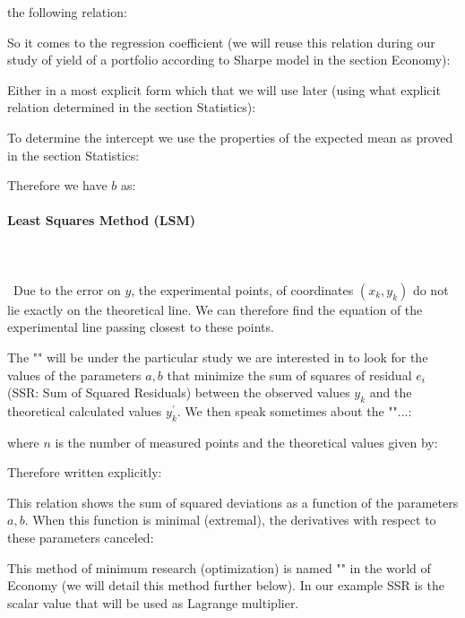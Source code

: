 	the following relation:
	
	So it comes to the regression coefficient (we will reuse this relation during our study of yield of a portfolio according to Sharpe model in the section Economy):
	
	Either in a most explicit form which that we will use later (using what explicit relation determined in the section Statistics):
	
	To determine the intercept we use the properties of the expected mean as proved in the section Statistics:
	
	Therefore we have $b$ as:
	
	
	\paragraph{Least Squares Method (LSM)}\mbox{}\\\\\
	Due to the error on $y$, the experimental points, of coordinates $(x_k,y_k)$ do not lie exactly on the theoretical line. We can therefore find the equation of the experimental  line passing closest to these points.
	
	The "" will be under the particular study we are interested in to look for the values of the parameters $a, b$ that minimize the sum of squares of residual $e_i$ (SSR: Sum of Squared Residuals) between the observed values $y_k$ and the theoretical calculated values $y_k^{'}$. We then speak sometimes about the ""...:
	
	where $n$ is the number of measured points and the theoretical values given by:
	
	Therefore written explicitly:
	
	This relation shows the sum of squared deviations as a function of the parameters $a, b$. When this function is minimal (extremal), the derivatives with respect to these parameters canceled:
	
	
	\begin{tcolorbox}[title=Remark,colframe=black,arc=10pt]
This method of minimum research (optimization) is named "" in the world of Economy (we will detail this method further below). In our example SSR is the scalar value that will be used as Lagrange multiplier.
	\end{tcolorbox}	
	
